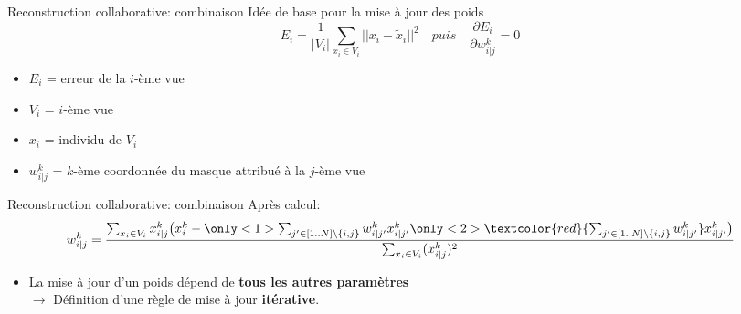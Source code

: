 \documentclass[hyperref={pdfpagelabels=false}]{beamer}
\begin{document}
    \begin{frame}{Reconstruction collaborative: combinaison}
        Idée de base pour la mise à jour des poids
        \begin{equation*}
             E_i = \frac{1}{|V_i|}\sum_{x_i \in V_i}||x_i - \widetilde{x}_i||^2 
             \quad puis \quad \frac{\partial E_i}{\partial w_{i|j}^k} = 0
        \end{equation*}
        \begin{itemize}
            \item $E_i$ = erreur de la $i$-ème vue
            \item $V_i$ = $i$-ème vue
            \item $x_i$ = individu de $V_i$
            \item $w_{i|j}^k$ = $k$-ème coordonnée du masque attribué à la 
                $j$-ème vue
        \end{itemize}
    \end{frame}

    \begin{frame}{Reconstruction collaborative: combinaison}
        Après calcul:
        \begin{equation*}
            w_{i|j}^k = \frac{\sum_{x_i \in V_i} x_{i|j}^k\big(x_i^k - 
                    \only<1>{\sum_{j'\in[1..N]\backslash \{i,j\}} w_{i|j'}^k 
                    x_{i|j'}^k}\only<2>{\textcolor{red}{ 
                    \sum_{j'\in[1..N]\backslash \{i,j\}} w_{i|j'}^k} x_{i|j'}^k}
            \big)}{\sum_{x_i \in V_i}(x_{i|j}^k)^2}
        \end{equation*}
        \begin{itemize}
            \item<2> La mise à jour d'un poids dépend de \textbf{tous les autres 
                paramètres}\\$\rightarrow$ Définition d'une règle de mise à jour 
                \textbf{itérative}.
        \end{itemize}
    \end{frame}
\end{document}

